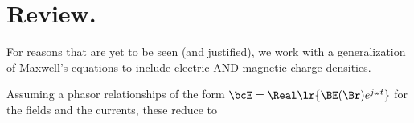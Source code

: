 %
%
%
%
%
%
%
%
%
%
%
\section{Review.}
%
For reasons that are yet to be seen (and justified), we work with a generalization of Maxwell's equations to include
electric AND magnetic charge densities.



Assuming a phasor relationships of the form \( \bcE = \Real \lr{ \BE(\Br) e^{j \omega t}} \) for the fields and the currents, these reduce to

